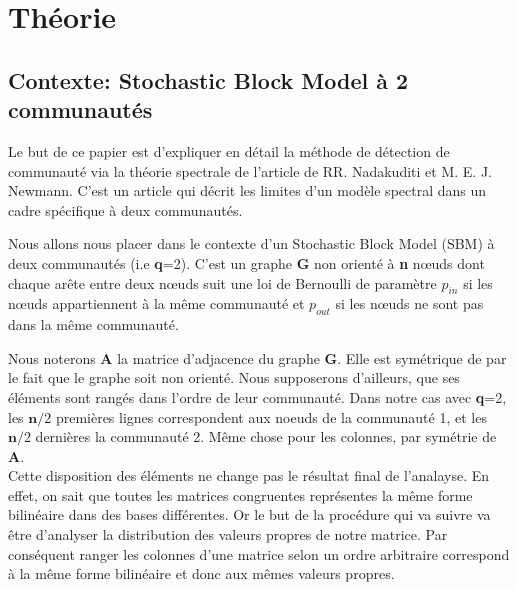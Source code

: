 \section{Théorie}
\subsection{Contexte: Stochastic Block Model à 2 communautés}
Le but de ce papier est d'expliquer en détail la méthode de détection de communauté via la théorie spectrale de l'article de RR. Nadakuditi et M. E. J. Newmann.
C'est un article qui décrit les limites d'un modèle spectral dans un cadre spécifique à deux communautés.

Nous allons nous placer dans le contexte d'un Stochastic Block Model (SBM) à deux communautés (i.e \textbf{q}=2).
C'est un graphe \textbf{G} non orienté à \textbf{n} nœuds dont chaque arête entre deux nœuds suit une loi de Bernoulli de paramètre $p_{in}$ si les nœuds appartiennent à la même communauté et $p_{out}$ si les nœuds ne sont pas dans la même communauté.  

Nous noterons \textbf{A} la matrice d'adjacence du graphe \textbf{G}.
Elle est symétrique de par le fait que le graphe soit non orienté.
Nous supposerons d'ailleurs, que ses éléments sont rangés dans l'ordre de leur communauté.
Dans notre cas avec \textbf{q}=2, les $\mathbf{n}/2$ premières lignes correspondent aux noeuds de la communauté 1, et les $\mathbf{n}/2$ dernières la communauté 2.
Même chose pour les colonnes, par symétrie de \textbf{A}.\\
Cette disposition des éléments ne change pas le résultat final de l'analayse.
En effet, on sait que toutes les matrices congruentes représentes la même forme bilinéaire dans des bases différentes. 
Or le but de la procédure qui va suivre va être d'analyser la distribution des valeurs propres de notre matrice.
Par conséquent ranger les colonnes d'une matrice selon un ordre arbitraire correspond à la même forme bilinéaire et donc aux mêmes valeurs propres.\\

